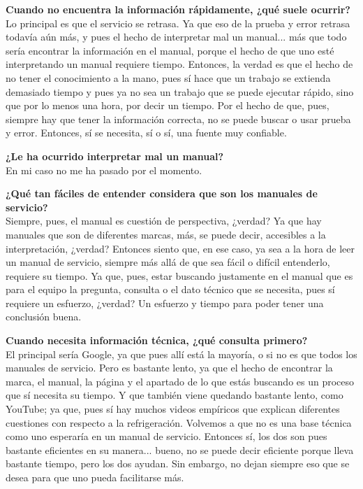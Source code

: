 {{    \textbf{Cuando no encuentra la información rápidamente, ¿qué suele ocurrir?}\\
    Lo principal es que el servicio se retrasa. Ya que eso de la prueba y error retrasa todavía aún más, y pues el hecho de interpretar mal un manual... más que todo sería encontrar la información en el manual, porque el hecho de que uno esté interpretando un manual requiere tiempo. Entonces, la verdad es que el hecho de no tener el conocimiento a la mano, pues sí hace que un trabajo se extienda demasiado tiempo y pues ya no sea un trabajo que se puede ejecutar rápido, sino que por lo menos una hora, por decir un tiempo. Por el hecho de que, pues, siempre hay que tener la información correcta, no se puede buscar o usar prueba y error. Entonces, sí se necesita, sí o sí, una fuente muy confiable.

    \textbf{¿Le ha ocurrido interpretar mal un manual?}\\
    En mi caso no me ha pasado por el momento.

    \textbf{¿Qué tan fáciles de entender considera que son los manuales de servicio?}\\
    Siempre, pues, el manual es cuestión de perspectiva, ¿verdad? Ya que hay manuales que son de diferentes marcas, más, se puede decir, accesibles a la interpretación, ¿verdad? Entonces siento que, en ese caso, ya sea a la hora de leer un manual de servicio, siempre más allá de que sea fácil o difícil entenderlo, requiere su tiempo. Ya que, pues, estar buscando justamente en el manual que es para el equipo la pregunta, consulta o el dato técnico que se necesita, pues sí requiere un esfuerzo, ¿verdad? Un esfuerzo y tiempo para poder tener una conclusión buena.

    \textbf{Cuando necesita información técnica, ¿qué consulta primero?}\\
    El principal sería Google, ya que pues allí está la mayoría, o si no es que todos los manuales de servicio. Pero es bastante lento, ya que el hecho de encontrar la marca, el manual, la página y el apartado de lo que estás buscando es un proceso que sí necesita su tiempo. Y que también viene quedando bastante lento, como YouTube; ya que, pues sí hay muchos videos empíricos que explican diferentes cuestiones con respecto a la refrigeración. Volvemos a que no es una base técnica como uno esperaría en un manual de servicio. Entonces sí, los dos son pues bastante eficientes en su manera... bueno, no se puede decir eficiente porque lleva bastante tiempo, pero los dos ayudan. Sin embargo, no dejan siempre eso que se desea para que uno pueda facilitarse más.

}}
